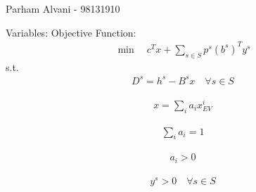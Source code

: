 \documentclass{article}
\begin{document}
\large %


{\Large  %
\hfill  }

\begin{center}
{\Large Parham Alvani - 98131910} %
\end{center}
\vspace{0.05in}


\par
Variables:
Objective Function:
\begin{align*}
    \min \quad c^Tx + \sum_{s \in S}p^s (b^s)^T y^s
\end{align*}
s.t.
\begin{align*}
        D^s = h^s - B^sx \quad \forall s \in S
\end{align*}

\begin{align*}
        x = \sum_{i} a_i x^i_{EV}
\end{align*}

\begin{align*}
        \sum_{i} a_i = 1
\end{align*}

\begin{align*}
        a_i \gt 0
\end{align*}

\begin{align*}
        y^s \gt 0 \quad \forall s \in S
\end{align*}

\end{document}
